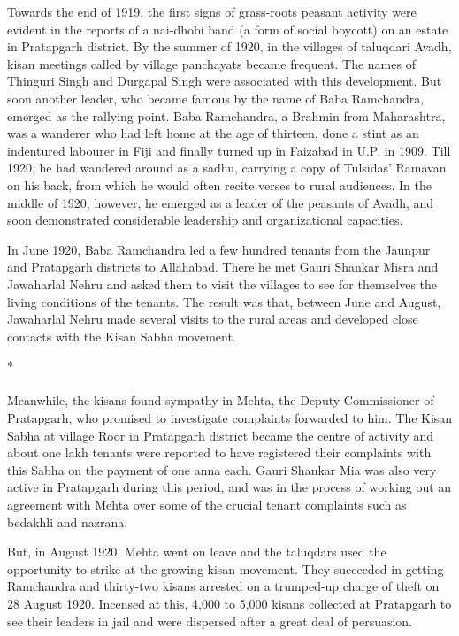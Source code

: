 Towards the end of 1919, the first signs of grass-roots peasant activity were evident in the reports of a nai-dhobi band (a form of social boycott) on an estate in Pratapgarh district. By the summer of 1920, in the villages of taluqdari Avadh, kisan meetings called by village panchayats became frequent. The names of Thinguri Singh and Durgapal Singh were associated with this development. But soon another leader, who became famous by the name of Baba Ramchandra, emerged as the rallying point. Baba Ramchandra, a Brahmin from Maharashtra, was a wanderer who had left home at the age of thirteen, done a stint as an indentured labourer in Fiji and finally turned up in Faizabad in U.P. in 1909. Till 1920, he had wandered around as a sadhu, carrying a copy of Tulsidas' Ramavan on his back, from which he would often recite verses to rural audiences. In the middle of 1920, however, he emerged as a leader of the peasants of Avadh, and soon demonstrated considerable leadership and organizational capacities.

In June 1920, Baba Ramchandra led a few hundred tenants from the Jaunpur and Pratapgarh districts to Allahabad. There he met Gauri Shankar Misra and Jawaharlal Nehru and asked them to visit the villages to see for themselves the living conditions of the tenants. The result was that, between June and August, Jawaharlal Nehru made several visits to the rural areas and developed close contacts with the Kisan Sabha movement.

\begin{center}*\end{center}

\paragraph*{}


Meanwhile, the kisans found sympathy in Mehta, the Deputy Commissioner of Pratapgarh, who promised to investigate complaints forwarded to him. The Kisan Sabha at village Roor in Pratapgarh district became the centre of activity and about one lakh tenants were reported to have registered their complaints with this Sabha on the payment of one anna each. Gauri Shankar Mia was also very active in Pratapgarh during this period, and was in the process of working out an agreement with Mehta over some of the crucial tenant complaints such as bedakhli and nazrana.

But, in August 1920, Mehta went on leave and the taluqdars used the opportunity to strike at the growing kisan movement. They succeeded in getting Ramchandra and thirty-two kisans arrested on a trumped-up charge of theft on 28 August 1920. Incensed at this, 4,000 to 5,000 kisans collected at Pratapgarh to see their leaders in jail and were dispersed after a great deal of persuasion.

